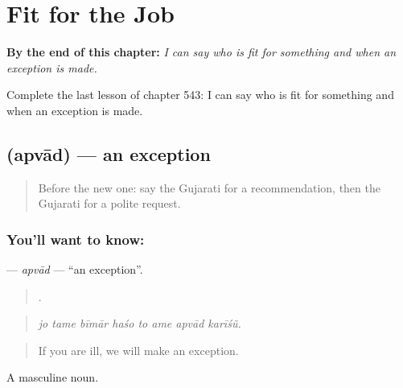 
\chapter{Fit for the Job}
\label{ch:gu-fit-for-the-job}

\begin{chapteropening}
\textbf{By the end of this chapter:} \emph{I can say who is fit for something and when an exception is made.}

Complete the last lesson of chapter 543: I can say who is fit for something and when an exception is made.
\end{chapteropening}

\section[\texorpdfstring{\gu{અપવાદ} (apvād)}{અપવાદ (apvād)}]{ (apvād) — an exception}

\label{lesson:GU-C543-apvad}



\begin{quote}
Before the new one: say the Gujarati for a recommendation, then the Gujarati for a polite request.
\end{quote}

\subsection*{You'll want to know: }
\textbf{} — \emph{apvād} — \textquotedblleft{}an exception\textquotedblright{}.

\begin{quote}
       .
\end{quote}

\begin{quote}
\emph{jo tame bīmār haśo to ame apvād karīśũ.}
\end{quote}

\begin{quote}
If you are ill, we will make an exception.
\end{quote}

A masculine noun.

